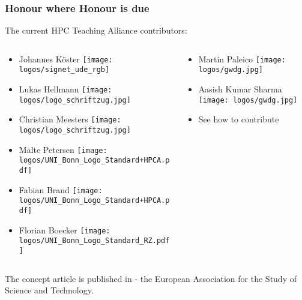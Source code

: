 \begin{frame}
  \frametitle{Honour where Honour is due}
  The current \Snakemake HPC Teaching Alliance contributors:
  \begin{columns}
  	\begin{column}{.5\textwidth}
  	   \begin{itemize}
  	   	\item Johannes Köster \texttt{[image: logos/signet\_ude\_rgb]}
  	   	\item Lukas Hellmann \texttt{[image: logos/logo\_schriftzug.jpg]}
  	   	\item Christian Meesters \texttt{[image: logos/logo\_schriftzug.jpg]}
  	   	\item Malte Petersen \texttt{[image: logos/UNI\_Bonn\_Logo\_Standard+HPCA.pdf]}
  	   	\item Fabian Brand \texttt{[image: logos/UNI\_Bonn\_Logo\_Standard+HPCA.pdf]}
  	   	\item Florian Boecker \texttt{[image: logos/UNI\_Bonn\_Logo\_Standard\_RZ.pdf]}
  	   \end{itemize}	
  	\end{column}
    \begin{column}{.5\textwidth}
      \begin{itemize}
    	\item Martin Paleico \texttt{[image: logos/gwdg.jpg]}
    	\item Aasish Kumar Sharma \texttt{[image: logos/gwdg.jpg]}
    	\item See how to contribute 
      \end{itemize}
    \end{column}
  \end{columns}
  \vfill
  The concept article is published in  - the European Association for the Study of Science and Technology.
		
\end{frame}

